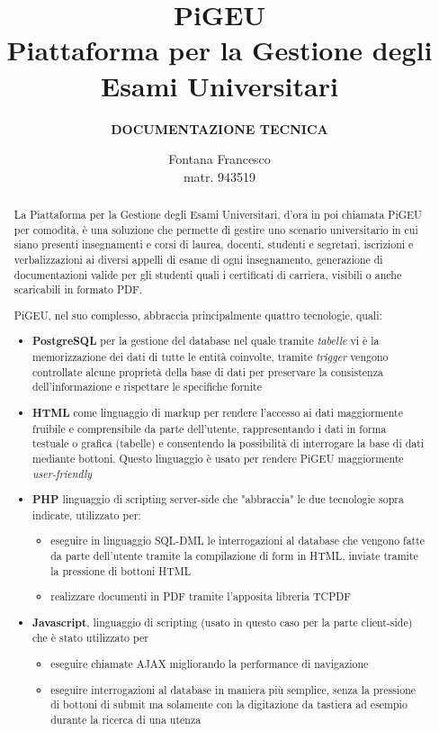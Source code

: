 \documentclass{article}
\title{PiGEU\\ Piattaforma per la Gestione degli Esami Universitari}
\author{\textbf{DOCUMENTAZIONE TECNICA}}
\date{Fontana Francesco \\ matr. 943519}
\begin{document}
    \maketitle

    \begin{abstract}

        La Piattaforma per la Gestione degli Esami Universitari, d'ora in poi chiamata PiGEU per comodità, è una soluzione che permette di gestire
        uno scenario universitario in cui siano presenti insegnamenti e corsi di laurea, docenti, studenti e segretari, iscrizioni e verbalizzazioni
        ai diversi appelli di esame di ogni insegnamento, generazione di documentazioni valide per gli studenti quali i certificati di carriera, visibili
        o anche scaricabili in formato PDF.

        PiGEU, nel suo complesso, abbraccia principalmente quattro tecnologie, quali:
        \begin{itemize}
            \item \textbf{PostgreSQL} per la gestione del database nel quale tramite \emph{tabelle} vi è la memorizzazione dei dati di tutte
            le entità coinvolte, tramite \emph{trigger} vengono controllate alcune proprietà della base di dati per preservare la consistenza dell'informazione e rispettare le specifiche fornite
            \item \textbf{HTML} come linguaggio di markup per rendere l'accesso ai dati maggiormente fruibile e comprensibile da parte dell'utente, rappresentando i dati in forma testuale o grafica (tabelle) e consentendo la possibilità di interrogare la base di dati mediante bottoni. Questo linguaggio è usato per rendere PiGEU maggiormente \emph{user-friendly}
            \item \textbf{PHP} linguaggio di scripting server-side che "abbraccia" le due tecnologie sopra indicate, utilizzato per:
            \begin{itemize}
                \item eseguire in linguaggio SQL-DML le interrogazioni al database che vengono fatte da parte dell'utente tramite la compilazione di form in HTML, inviate tramite la pressione di bottoni HTML
                \item realizzare documenti in PDF tramite l'apposita libreria TCPDF
            \end{itemize}
            \item \textbf{Javascript}, linguaggio di scripting (usato in questo caso per la parte client-side) che è stato utilizzato per
            \begin{itemize}
                \item eseguire chiamate AJAX migliorando la performance di navigazione
                \item eseguire interrogazioni al database in maniera più semplice, senza la pressione di bottoni di submit ma solamente con la digitazione da tastiera ad esempio durante la ricerca di una utenza
            \end{itemize}
        \end{itemize}


\end{abstract}
\end{document}
